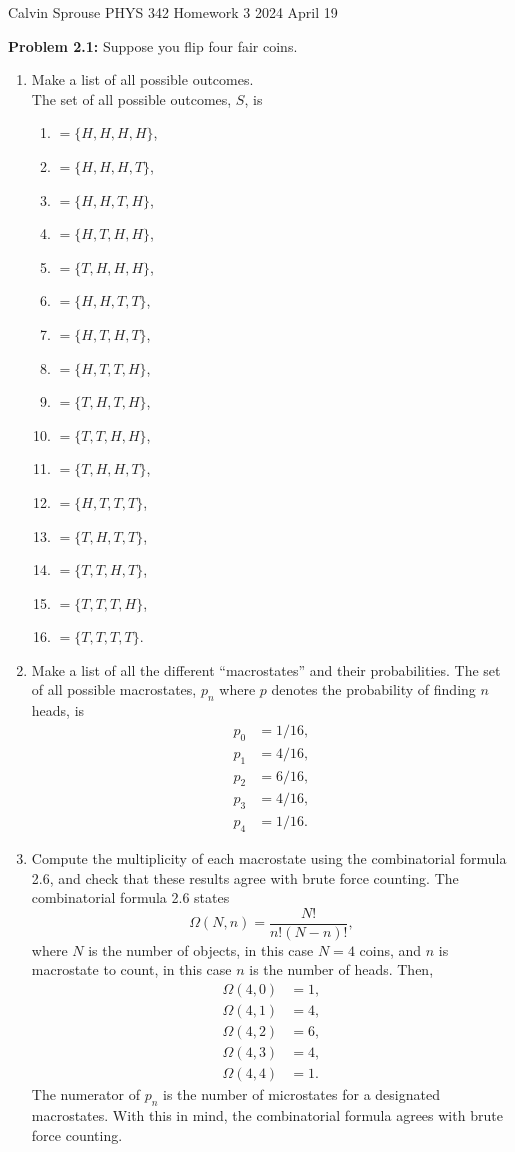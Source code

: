 \documentclass[a4paper, 12pt]{config/homework}
\begin{document}
\noindent
\hfill Calvin Sprouse \hfill PHYS 342 Homework 3 \hfill 2024 April 19 \hfill

\bigskip\noindent
\textbf{Problem 2.1:} Suppose you flip four fair coins.
\begin{enumerate}[label=\textbf{(\alph*)}]
\item Make a list of all possible outcomes. \\
\bigskip\noindent
The set of all possible outcomes, \(S\), is
\begin{enumerate}[label=\(S_{\arabic*}\)]
\item \(=\{H,H,H,H\}\),
\item \(=\{H,H,H,T\}\),
\item \(=\{H,H,T,H\}\),
\item \(=\{H,T,H,H\}\),
\item \(=\{T,H,H,H\}\),
\item \(=\{H,H,T,T\}\),
\item \(=\{H,T,H,T\}\),
\item \(=\{H,T,T,H\}\),
\item \(=\{T,H,T,H\}\),
\item \(=\{T,T,H,H\}\),
\item \(=\{T,H,H,T\}\),
\item \(=\{H,T,T,T\}\),
\item \(=\{T,H,T,T\}\),
\item \(=\{T,T,H,T\}\),
\item \(=\{T,T,T,H\}\),
\item \(=\{T,T,T,T\}\).
\end{enumerate}
\pagebreak
\item Make a list of all the different ``macrostates'' and their probabilities.
The set of all possible macrostates, \(p_n\) where \(p\) denotes the probability of finding \(n\) heads, is
\begin{align*}
p_0 &= 1/16, \\
p_1 &= 4/16, \\
p_2 &= 6/16, \\
p_3 &= 4/16, \\
p_4 &= 1/16.
\end{align*}
\item Compute the multiplicity of each macrostate using the combinatorial formula 2.6, and check that these results agree with brute force counting.
\bigskip\noindent
The combinatorial formula 2.6 states
\[\Omega(N,n)=\frac{N!}{n!(N-n)!},\]
where \(N\) is the number of objects, in this case \(N=4\) coins, and \(n\) is macrostate to count, in this case \(n\) is the number of heads. Then,
\begin{align*}
\Omega(4,0) &= 1,\\
\Omega(4,1) &= 4,\\
\Omega(4,2) &= 6,\\
\Omega(4,3) &= 4,\\
\Omega(4,4) &= 1.
\end{align*}
The numerator of \(p_n\) is the number of microstates for a designated macrostates. With this in mind, the combinatorial formula agrees with brute force counting.
\end{enumerate}
\end{document}
